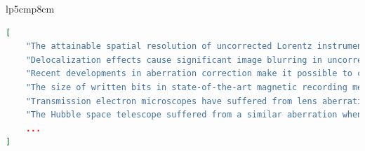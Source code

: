 \documentclass[11pt]{article}
\begin{document}
\begin{table}[h]
\begin{tabular}{lp{5cm}p{8cm}}
\begin{minipage}{\linewidth}
\begin{lstlisting}[language=json]
[
    "The attainable spatial resolution of uncorrected Lorentz instruments is in the range 10-15 nm.",
    "Delocalization effects cause significant image blurring in uncorrected Lorentz microscopes.",
    "Recent developments in aberration correction make it possible to correct the spherical aberration of a Lorentz lens.",
    "The size of written bits in state-of-the-art magnetic recording media is comparable to the magnetic resolution of uncorrected Lorentz microscopes.",
    "Transmission electron microscopes have suffered from lens aberration since their invention in the 1930s.",
    "The Hubble space telescope suffered from a similar aberration when first launched.",
    ...
]
\end{lstlisting}
\end{minipage} \\
    \bottomrule
    \end{tabular}
    \caption{A sample of extracted claims from the \DatasetNameMatSci~dataset. Award IDs are hyperlinked to the NSF's Award database.}
    \label{tab:claim-examples}
\end{table}
\end{document}
